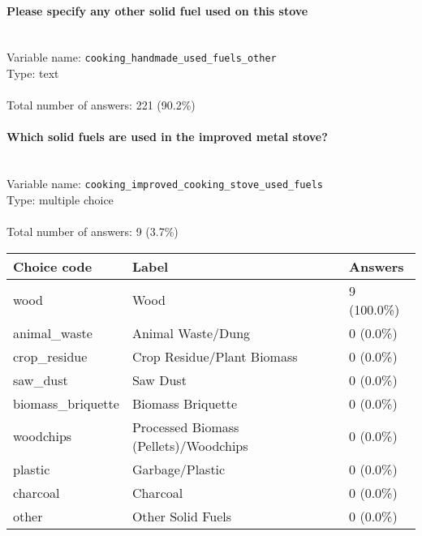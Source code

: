 \documentclass[11.5pt, a4paper]{scrartcl}
\begin{document}
\paragraph{Please specify any other solid fuel used on this stove}
\  \\Variable name: \texttt{cooking\_handmade\_used\_fuels\_other}\\
Type: text\\
\\Total number of answers: 221 (90.2\%)
\\[0.2em]\paragraph{Which solid fuels are used in the improved metal stove?}
\  \\Variable name: \texttt{cooking\_improved\_cooking\_stove\_used\_fuels}\\
Type: multiple choice\\
\\Total number of answers: 9 (3.7\%)
\\[0.2em] \begin{tabular}{p{4cm}|p{8cm}|p{3cm}}
Choice code & Label & Answers \\
\hline
wood & Wood& \cellcolor{color4}9 (100.0\%)\\
\cellcolor{mygray} animal\_waste & \cellcolor{mygray}Animal Waste/Dung & \cellcolor{color0}0 (0.0\%)\\
crop\_residue & Crop Residue/Plant Biomass& \cellcolor{color0}0 (0.0\%)\\
\cellcolor{mygray} saw\_dust & \cellcolor{mygray}Saw Dust & \cellcolor{color0}0 (0.0\%)\\
biomass\_briquette & Biomass Briquette& \cellcolor{color0}0 (0.0\%)\\
\cellcolor{mygray} woodchips & \cellcolor{mygray}Processed Biomass (Pellets)/Woodchips & \cellcolor{color0}0 (0.0\%)\\
plastic & Garbage/Plastic& \cellcolor{color0}0 (0.0\%)\\
\cellcolor{mygray} charcoal & \cellcolor{mygray}Charcoal & \cellcolor{color0}0 (0.0\%)\\
other & Other Solid Fuels& \cellcolor{color0}0 (0.0\%)\\
\end{tabular}
\end{document}
